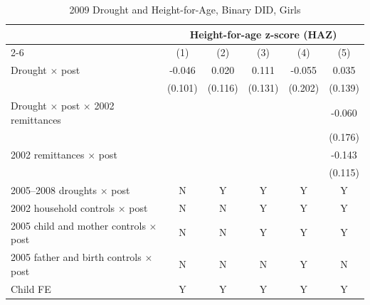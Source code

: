 \documentclass[12pt]{article}
\begin{document}
\begin{longtable}{l*{5}{c}}
\caption{2009 Drought and Height-for-Age, Binary DID, Girls}\\
\toprule
 & \multicolumn{5}{c}{Height-for-age z-score (HAZ)}\\
\cmidrule(lr){2-6}
            &\multicolumn{1}{c}{(1)}         &\multicolumn{1}{c}{(2)}         &\multicolumn{1}{c}{(3)}         &\multicolumn{1}{c}{(4)}         &\multicolumn{1}{c}{(5)}         \\
\midrule
Drought \ensuremath{\times} post&      -0.046         &       0.020         &       0.111         &      -0.055         &       0.035         \\
            &     (0.101)         &     (0.116)         &     (0.131)         &     (0.202)         &     (0.139)         \\
Drought \ensuremath{\times} post \ensuremath{\times} 2002 remittances&                     &                     &                     &                     &      -0.060         \\
            &                     &                     &                     &                     &     (0.176)         \\
2002 remittances \ensuremath{\times} post&                     &                     &                     &                     &      -0.143         \\
            &                     &                     &                     &                     &     (0.115)         \\
\midrule
2005--2008 droughts \ensuremath{\times} post&           N         &           Y         &           Y         &           Y         &           Y         \\
2002 household controls \ensuremath{\times} post&           N         &           N         &           Y         &           Y         &           Y         \\
2005 child and mother controls \ensuremath{\times} post&           N         &           N         &           Y         &           Y         &           Y         \\
2005 father and birth controls \ensuremath{\times} post&           N         &           N         &           N         &           Y         &           N         \\
Child FE    &           Y         &           Y         &           Y         &           Y         &           Y         \\

\end{longtable}
\end{document}

